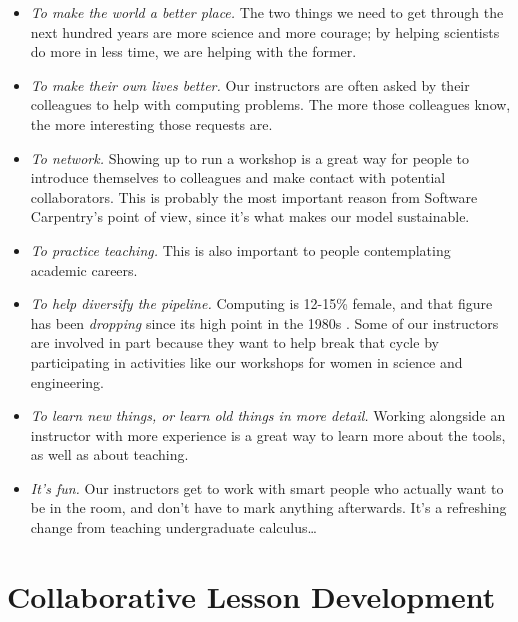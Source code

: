\documentclass[10pt,a4paper,twocolumn]{article}
\begin{document}
\begin{itemize}

\item \emph{To make the world a better place.}  The two things we
  need to get through the next hundred years are more science and more
  courage; by helping scientists do more in less time, we are helping
  with the former.

\item \emph{To make their own lives better.}  Our instructors are
  often asked by their colleagues to help with computing problems.
  The more those colleagues know, the more interesting those requests
  are.

\item \emph{To network.}  Showing up to run a workshop is a great way
  for people to introduce themselves to colleagues and make contact
  with potential collaborators. This is probably the most important
  reason from Software Carpentry's point of view, since it's what
  makes our model sustainable.

\item \emph{To practice teaching.}  This is also important to people
  contemplating academic careers.
 
\item \emph{To help diversify the pipeline.}  Computing is 12-15\%
  female, and that figure has been \emph{dropping} since its high
  point in the 1980s \cite{wic}. Some of our instructors are
  involved in part because they want to help break that cycle by
  participating in activities like our workshops for women in science
  and engineering.

\item \emph{To learn new things, or learn old things in more detail.}
  Working alongside an instructor with more experience is a great way
  to learn more about the tools, as well as about teaching.

\item \emph{It's fun.}  Our instructors get to work with smart people
  who actually want to be in the room, and don't have to mark anything
  afterwards. It's a refreshing change from teaching undergraduate
  calculus\ldots{}

\end{itemize}

\section{Collaborative Lesson Development}\label{s:lesson-collab}
\end{document}
